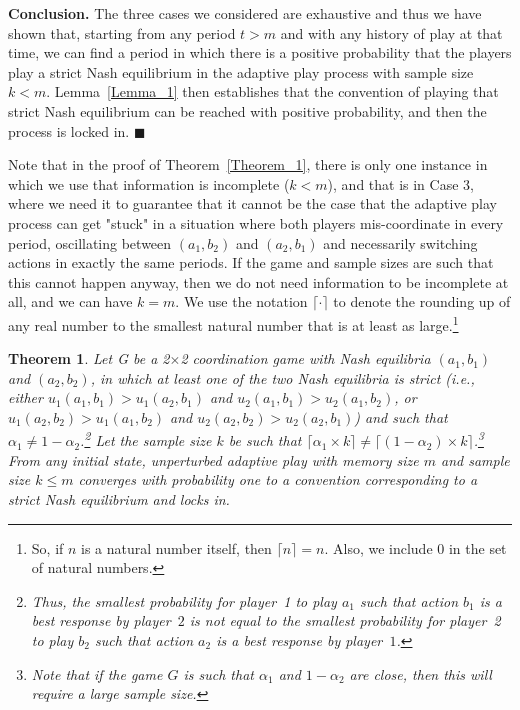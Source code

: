\documentclass[11.5pt]{article}
\newtheorem{theorem}{Theorem}
\begin{document}
{\bf Conclusion.} The three cases we considered are exhaustive and thus we have shown that, starting  from any period $t>m$ and with any history of play at that time, we can find a period in which there is a positive probability that the players play a strict Nash equilibrium in the adaptive play process with sample size $k<m$. Lemma~\ref{Lemma_1} then establishes that the convention of playing that strict Nash equilibrium can be reached with positive probability, and then the process is locked in.
$\blacksquare$

\medskip
Note that in the proof of Theorem~\ref{Theorem_1}, there is only one instance in which we use that information is incomplete ($k<m$), and that is in Case 3, where we need it to guarantee that it cannot be the case that the adaptive play process can get "stuck" in a situation where both players mis-coordinate in every period, oscillating between $(a_1,b_2)$ and $(a_2,b_1)$ and necessarily switching actions in exactly the same periods. 
%
If the game and sample sizes are such that this cannot happen anyway, then we do not need information to be incomplete at all, and we can have $k=m$. 
We use the notation $\lceil\cdot\rceil$ to denote the rounding up of any real number to the smallest natural number that is at least as large.\footnote{So, if $n$ is a natural number itself, then $\lceil n\rceil=n$. Also, we include $0$ in the set of natural numbers.}





\begin{theorem}\label{Theorem_2}
Let G be a 2$\times$2 coordination game with Nash equilibria $(a_1,b_1)$ and $(a_2,b_2)$,  
in which at least one of the two Nash equilibria is strict (i.e., either $u_1(a_1,b_1) > u_1(a_2,b_1)$ and $u_2(a_1,b_1) > u_2(a_1,b_2)$, or $u_1(a_2,b_2) > u_1(a_1,b_2)$ and $u_2(a_2,b_2) > u_2(a_2,b_1)$)  
%
and such that $\alpha_1\neq 1-\alpha_2$.\footnote{Thus, the smallest probability for player~1 to play $a_1$ such that action $b_1$ is a best response by player~$2$ is not equal to the smallest probability for player~2 to play $b_2$ such that action $a_2$ is a best response by player~$1$.} 
%
Let the sample size $k$ be such that $\lceil\alpha_1\times k\rceil \neq \lceil (1-\alpha_2)\times k\rceil$.\footnote{Note that if the game $G$ is such that $\alpha_1$ and $1-\alpha_2$ are close, then this will require a large sample size.}
From any initial state, unperturbed adaptive play with memory size $m$ and sample size $k \leq m$ converges with probability one to a convention corresponding to a strict Nash equilibrium and locks in.
\end{theorem}
\end{document}
